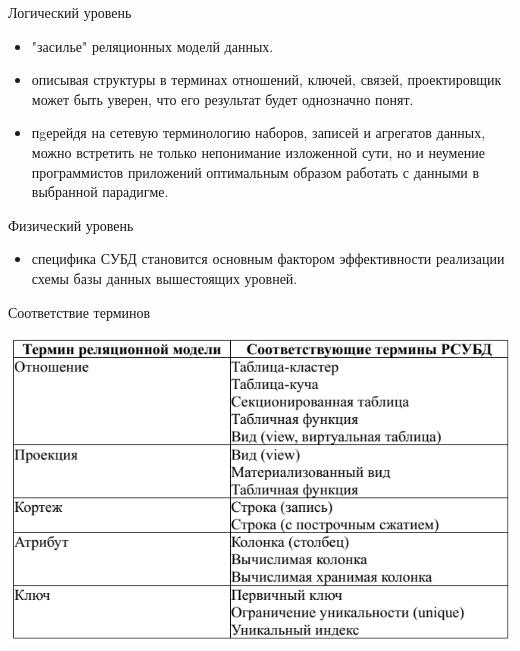 \documentclass{beamer}
\begin{document}
\begin{frame}
\begin{block}{Логический уровень}
\begin{itemize}
\item "засилье" реляционных моделй данных.
\item описывая структуры в терминах отношений, ключей, связей, проектировщик может быть уверен, что его результат будет однозначно понят.
\item пgерейдя на сетевую терминологию наборов, записей и агрегатов данных, можно встретить не только непонимание изложенной сути, но и неумение программистов приложений оптимальным
образом работать с данными в выбранной парадигме.
\end{itemize}
\end{block}
\end{frame} 

\begin{frame}
\begin{block}{Физический уровень}
\begin{itemize}
\item специфика СУБД становится основным фактором эффективности реализации схемы базы данных
вышестоящих уровней.
\end{itemize}
\end{block}
\begin{block}{Соответствие терминов}
\begin{center}
\includegraphics[scale=0.5]{images/rel-dbms.png}
\end{center}
\end{block}
\end{frame} 
\end{document}
